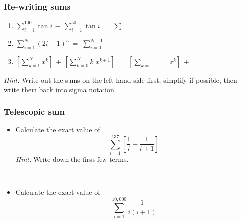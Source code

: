 \documentclass[14pt]{beamer}
\newcommand {\DS} [1] {${\displaystyle #1}$}
\newcommand{\p}{\pause}
\newcommand{\setsize}[1]{\fontsize{#1}{#1}\selectfont} %
\newcommand{\smallerfont}{\setsize{13}} %
\newcommand{\aaa}{\boxed{\phantom{???}}}
\newcommand{\bbb}{\boxed{\phantom{?????^f_p}}}
\begin{document}
\begin{frame}[t]
\smallerfont
\frametitle{Re-writing sums}

\begin{enumerate}
\item	\DS{\sum_{i=1}^{100} \tan i   \, - \, \sum_{i=1}^{50}  \tan i \; = \; \sum_{\aaa}^{\aaa} \bbb }
\vfill

\item  \DS{\sum_{i=1}^{N} (2i-1)^5  \; =  \; \sum_{i=0}^{N-1}  \bbb }
\vfill

\item  \DS{ \left[ \sum_{k=1}^N x^k  \right] \, + \, \left[ \sum_{k=0}^{N} k \; x^{k+1} \right] \; = \; \left[ \sum_{k=\aaa}^{\aaa} \!\!\aaa \,x^k  \right] \, + \, \aaa }
\vfill
\end{enumerate}

\emph{Hint:} Write out the sums on the left hand side first, simplify if possible, then write them back into sigma notation.
\end{frame}
\begin{frame}[t]
\frametitle{Telescopic sum}

\begin{itemize}
\item Calculate the exact value of 
$$
	\sum_{i=1}^{137}  \left[  \frac{1}{i} - \frac{1}{i+1} \right]
$$
\emph{Hint:} Write down the first few terms.

\p \

\item Calculate the exact value of 
$$
	\sum_{i=1}^{10,000}    \frac{1}{i(i+1)} 
$$
\end{itemize}


\end{frame}
\end{document}
